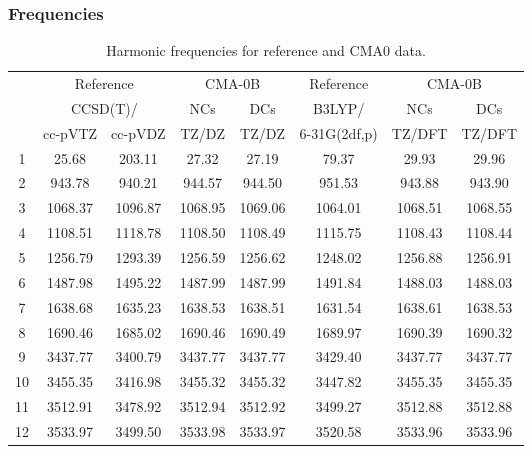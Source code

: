 \documentclass[10pt,oneside]{article}
\begin{document}
\clearpage

\subsubsection*{Frequencies}
\begin{table}[h!]
\centering
\caption{Harmonic frequencies for reference and CMA0 data.}
\begin{tabular}{cccccccc}
\toprule
{} & \multicolumn{2}{c}{Reference} & \multicolumn{2}{c}{CMA-0B} &    Reference & \multicolumn{2}{c}{CMA-0B} \\
{} & \multicolumn{2}{c}{CCSD(T)/} &     NCs &     DCs &       B3LYP/ &     NCs &     DCs \\
{} &   cc-pVTZ & cc-pVDZ &   TZ/DZ &   TZ/DZ & 6-31G(2df,p) &  TZ/DFT &  TZ/DFT \\
\midrule
1  &     25.68 &  203.11 &   27.32 &   27.19 &        79.37 &   29.93 &   29.96 \\
2  &    943.78 &  940.21 &  944.57 &  944.50 &       951.53 &  943.88 &  943.90 \\
3  &   1068.37 & 1096.87 & 1068.95 & 1069.06 &      1064.01 & 1068.51 & 1068.55 \\
4  &   1108.51 & 1118.78 & 1108.50 & 1108.49 &      1115.75 & 1108.43 & 1108.44 \\
5  &   1256.79 & 1293.39 & 1256.59 & 1256.62 &      1248.02 & 1256.88 & 1256.91 \\
6  &   1487.98 & 1495.22 & 1487.99 & 1487.99 &      1491.84 & 1488.03 & 1488.03 \\
7  &   1638.68 & 1635.23 & 1638.53 & 1638.51 &      1631.54 & 1638.61 & 1638.53 \\
8  &   1690.46 & 1685.02 & 1690.46 & 1690.49 &      1689.97 & 1690.39 & 1690.32 \\
9  &   3437.77 & 3400.79 & 3437.77 & 3437.77 &      3429.40 & 3437.77 & 3437.77 \\
10 &   3455.35 & 3416.98 & 3455.32 & 3455.32 &      3447.82 & 3455.35 & 3455.35 \\
11 &   3512.91 & 3478.92 & 3512.94 & 3512.92 &      3499.27 & 3512.88 & 3512.88 \\
12 &   3533.97 & 3499.50 & 3533.98 & 3533.97 &      3520.58 & 3533.96 & 3533.96 \\
\bottomrule
\end{tabular}
\end{table}

\clearpage
\end{document}
